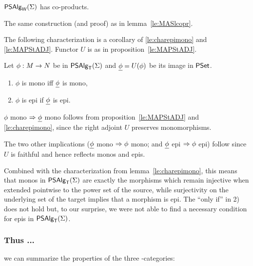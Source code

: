 \documentclass[10pt]{article}
\begin{document}
\begin{Fact}
$\mbox{\sf PSAlg}_{\sf W}(\Sigma)$ has co-products.
\end{Fact}

\begin{Proof}
The same construction (and proof) as in lemma~\ref{le:MASlcopr}.
\end{Proof}

\noindent
The following characterization is a corollary of \ref{le:charepimono}
and \ref{le:MAPStADJ}. Functor $U$ is as in proposition~\ref{le:MAPStADJ}.

\begin{Prop}
Let $\phi:M\rightarrow N$ be in $\mbox{\sf PSAlg}_{\sf T}(\Sigma)$ and $\underline {\phi}=U(\phi)$ be its
image in $\mbox{\rm\sf PSet}$.
\begin{enumerate}\MyLPar
\item $\phi$ is mono iff $\underline {\phi}$ is mono,
\item $\phi$ is epi if $\underline {\phi}$ is epi.
\end{enumerate}

\end{Prop}

\begin{Proof}
$\phi$ mono $\Rightarrow\underline {\phi}$ mono follows from
proposition~\ref{le:MAPStADJ} and \ref{le:charepimono}, since the right
adjoint $U$ preserves monomorphisms.


The two other implications ($\underline {\phi}$ mono $\Rightarrow \phi$ mono; and
$\underline {\phi}$ epi $\Rightarrow \phi$ epi) follow since
$U$ is faithful and hence reflects monos and epis.
\end{Proof}
Combined with the characterization from lemma~\ref{le:charepimono},
this means that monos in $\mbox{\sf PSAlg}_{\sf T}(\Sigma)$ are exactly the morphisms which
remain injective when extended pointwise to the power set of the
source, while surjectivity on the underlying set of the target implies
that a morphism is epi.
The ``only if'' in 2) does not hold but, to our surprise, we were not able
to find a necessary condition for epis in $\mbox{\sf PSAlg}_{\sf T}(\Sigma)$.


\subsubsection*{Thus ...}
we can summarize the properties of the three \PS-categories:
\end{document}
